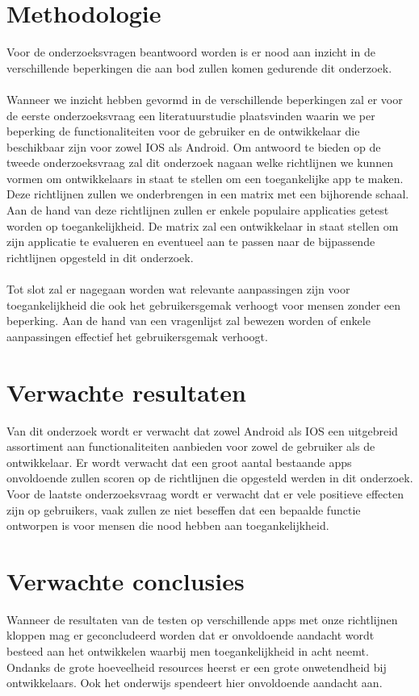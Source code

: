 \section{Methodologie}
\label{sec:methodologie}

Voor de onderzoeksvragen beantwoord worden is er nood aan inzicht in de verschillende beperkingen die aan bod zullen komen gedurende dit onderzoek. 
\\~\\
Wanneer we inzicht hebben gevormd in de verschillende beperkingen zal er voor de eerste onderzoeksvraag een literatuurstudie plaatsvinden waarin we per beperking de functionaliteiten voor de gebruiker en de ontwikkelaar die beschikbaar zijn voor zowel IOS als Android. Om antwoord te bieden op de tweede onderzoeksvraag zal dit onderzoek nagaan welke richtlijnen we kunnen vormen om ontwikkelaars in staat te stellen om een toegankelijke app te maken. Deze richtlijnen zullen we onderbrengen in een matrix met een bijhorende schaal. 
Aan de hand van deze richtlijnen zullen er enkele populaire applicaties getest worden op toegankelijkheid. De matrix zal een ontwikkelaar in staat stellen om zijn applicatie te evalueren en eventueel aan te passen naar de bijpassende richtlijnen opgesteld in dit onderzoek. 
\\~\\Tot slot zal er nagegaan worden wat relevante aanpassingen zijn voor toegankelijkheid die ook het gebruikersgemak verhoogt voor mensen zonder een beperking. Aan de hand van een vragenlijst zal bewezen worden of enkele aanpassingen effectief het gebruikersgemak verhoogt.


\section{Verwachte resultaten}
\label{sec:verwachte_resultaten}

Van dit onderzoek wordt er verwacht dat zowel Android als IOS een uitgebreid assortiment aan functionaliteiten aanbieden voor zowel de gebruiker als de ontwikkelaar. Er wordt verwacht dat een groot aantal bestaande apps onvoldoende zullen scoren op de richtlijnen die opgesteld werden in dit onderzoek. Voor de laatste onderzoeksvraag wordt er verwacht dat er vele positieve effecten zijn op gebruikers, vaak zullen ze niet beseffen dat een bepaalde functie ontworpen is voor mensen die nood hebben aan toegankelijkheid.

\section{Verwachte conclusies}
\label{sec:verwachte_conclusies}

Wanneer de resultaten van de testen op verschillende apps met onze richtlijnen kloppen mag er geconcludeerd worden dat er onvoldoende aandacht wordt besteed aan het ontwikkelen waarbij men toegankelijkheid in acht neemt. Ondanks de grote hoeveelheid resources heerst er een grote onwetendheid bij ontwikkelaars. Ook het onderwijs spendeert hier onvoldoende aandacht aan.
